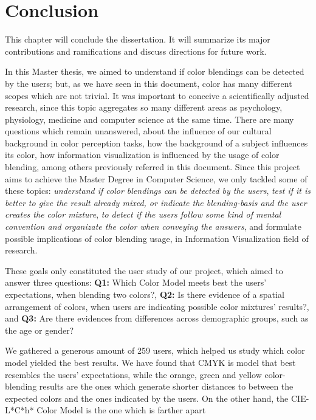 
\chapter{Conclusion}
\label{chapter:conclusion}
%
This chapter will conclude the dissertation. It will summarize its major contributions and ramifications and discuss directions for future work. \par
%
In this Master thesis, we aimed to understand if color blendings can be detected by the users; but, as we have seen in this document, color has many
different scopes which are not trivial. It was important to conceive a scientifically adjusted research, since this topic aggregates so many different
areas as psychology, physiology, medicine and computer science at the same time. There are many questions which remain unanswered, about the influence
of our cultural background in color perception tasks, how the background of a subject influences its color, how information visualization is influenced
by the usage of color blending, among others previously referred in this document. Since this project aims to achieve the Master Degree in Computer
Science, we only tackled some of these topics: \emph{understand if color blendings can be detected by the users}, \emph{test if it is better to give
the result already mixed, or indicate the blending-basis and the user creates the color mixture}, \emph{to detect if the users follow some kind of
mental convention and organizate the color when conveying the answers}, and formulate possible implications of color blending usage, in Information
Visualization field of research. \par
%
These goals only constituted the user study of our project, which aimed to answer three questions: \textbf{Q1:} Which Color Model meets best the users'
expectations, when blending two colors?, \textbf{Q2:} Is there evidence of a spatial arrangement of colors, when users are indicating possible color
mixtures' results?, and \textbf{Q3:} Are there evidences from differences across demographic groups, such as the age or gender? \par
%
We gathered a generous amount of 259 users, which helped us study which color model yielded the best results. We have found that CMYK is model that
best resembles the users' expectations, while the orange, green and yellow color-blending results are the ones which generate shorter distances to
between the expected colors and the ones indicated by the users. On the other hand, the CIE-L*C*h* Color Model is the one which is farther apart

